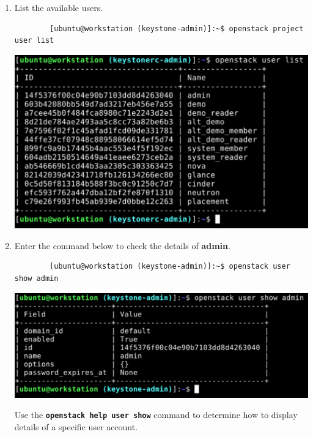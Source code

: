 \documentclass[letterpaper, 12pt]{article}
\begin{document}
\begin{enumerate}
    \item List the available users.
    \begin{lstlisting}
        [ubuntu@workstation (keystone-admin)]:~$ openstack project user list
    \end{lstlisting}

    \begin{center}
        \includegraphics[width=\linewidth]{images/part2/step7.png}
    \end{center}

    \item Enter the command below to check the details of \textbf{admin}.
    \begin{lstlisting}
        [ubuntu@workstation (keystone-admin)]:~$ openstack user show admin
    \end{lstlisting}

    \begin{center}
        \includegraphics[width=\linewidth]{images/part2/step8.png}
    \end{center}

    \begin{tipbox}
        Use the \textbf{\texttt{openstack help user show}} command to determine how to display details of a specific
        user account.
    \end{tipbox}


\end{enumerate}
\end{document}
